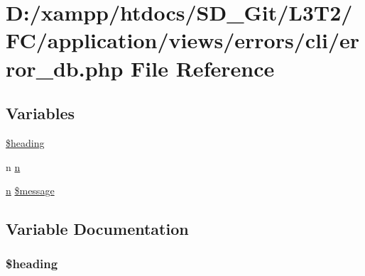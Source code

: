 \hypertarget{application_2views_2errors_2cli_2error__db_8php}{}\section{D\+:/xampp/htdocs/\+S\+D\+\_\+\+Git/\+L3\+T2/\+F\+C/application/views/errors/cli/error\+\_\+db.php File Reference}
\label{application_2views_2errors_2cli_2error__db_8php}
\subsection*{Variables}
\begin{DoxyCompactItemize}
\item 
\hyperlink{application_2views_2errors_2cli_2error__db_8php_a196169be7715d466e3310388b096598c}{\$heading}
\item 
n \hyperlink{application_2views_2errors_2cli_2error__db_8php_ace0fd03cd383f20ce6ea63247a207294}{n}
\item 
\hyperlink{_admin_2application_2views_2errors_2cli_2error__general_8php_ace0fd03cd383f20ce6ea63247a207294}{n} \hyperlink{application_2views_2errors_2cli_2error__db_8php_aaba2b6aee423b3b5e46000f90b4c8c7f}{\$message}
\end{DoxyCompactItemize}


\subsection{Variable Documentation}
\hypertarget{application_2views_2errors_2cli_2error__db_8php_a196169be7715d466e3310388b096598c}{}
\subsubsection[{\$heading}]{\setlength{\rightskip}{0pt plus 5cm}\$heading}\label{application_2views_2errors_2cli_2error__db_8php_a196169be7715d466e3310388b096598c}
\hypertarget{application_2views_2errors_2cli_2error__db_8php_aaba2b6aee423b3b5e46000f90b4c8c7f}{}
